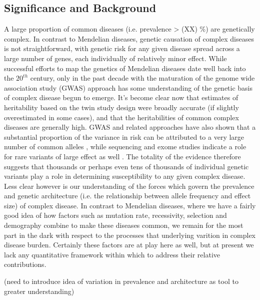 \documentclass[11pt]{article}
\newcommand{\jb}[1]{{\color{blue} (#1)} }
\begin{document}
\subsection*{Significance and Background}

A large proportion of common diseases (i.e. prevalence > \jb{XX}\%) are genetically complex. In contrast to Mendelian diseases, genetic causation of complex diseases is not straightforward, with genetic risk for any given disease spread across a large number of genes, each individually of relatively minor effect. While successful efforts to map the genetics of Mendelian diseases date well back into the $20^{th}$ century, only in the past decade with the maturation of the genome wide association study (GWAS) approach has some understanding of the genetic basis of complex disease begun to emerge\cite{Visscher:2012je,get_more}. It's become clear now that estimates of heritability based on the twin study design were broadly accurate (if slightly overestimated in some cases), and that the heritabilities of common complex diseases are generally high. GWAS and related approaches have also shown that a substantial proportion of the variance in risk can be attributed to a very large number of common alleles \cite{Consortium:2009ef, Lee:2012iu,Loh:2015hz, Ripke:2014eb}, while sequencing and exome studies indicate a role for rare variants of large effect as well \cite{Richards:2016cs, Genovese:2016fv, Purcell:2014gw}. The totality of the evidence therefore suggests that thousands or perhaps even tens of thousands of individual genetic variants play a role in determining susceptibility to any given complex disease. Less clear however is our understanding of the forces which govern the prevalence and genetic architecture (i.e. the relationship between allele frequency and effect size) of complex disease. In contrast to Mendelian diseases, where we have a fairly good idea of how factors such as mutation rate, recessivity, selection \cite{Patil:2010ha} and demography \cite{HurlesText} combine to make these diseases common, we remain for the most part in the dark with respect to the processes that underlying varition in complex disease burden. Certainly these factors are at play here as well, but at present we lack any quantitative framework within which to address their relative contributions.

\jb{need to introduce idea of variation in prevalence and architecture as tool to greater understanding}
\end{document}
